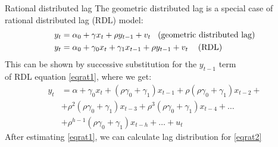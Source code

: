 \documentclass{beamer}
\begin{document}
\begin{frame}{Rational distributed lag}
The geometric distributed lag is a special case of \\rational distributed lag (RDL) model:
\begin{align} \nonumber
y_t & = \alpha_0+\gamma x_t + \rho y_{t-1} + v_t \hspace{0.3cm} \textnormal{(geometric distributed lag)}\\\label{eqrat1} 
y_t & = \alpha_0+\gamma_0 x_t +\gamma_1 x_{t-1} + \rho y_{t-1} + v_t  \hspace{0.3cm} \textnormal{ (RDL)}
\end{align}
This can be shown by successive substitution for the $y_{t-1}$ term \\of RDL equation \eqref{eqrat1}, where we get:
\begin{align}\nonumber
y_t & = \alpha + \gamma_0 x_t + (\rho \gamma_0 + \gamma_1) x_{t-1} + \rho (\rho \gamma_0 + \gamma_1) x_{t-2} +\\ & + \rho^2 (\rho \gamma_0 + \gamma_1) x_{t-3} + \rho^3 (\rho \gamma_0 + \gamma_1) x_{t-4}+ \dots \nonumber \\  &+\rho^{h-1}(\rho \gamma_0 + \gamma_1)x_{t-h} + \dots + u_t \label{eqrat2}
\end{align}
After estimating \eqref{eqrat1}, we can calculate lag distribution for \eqref{eqrat2}

\end{frame}
\end{document}
